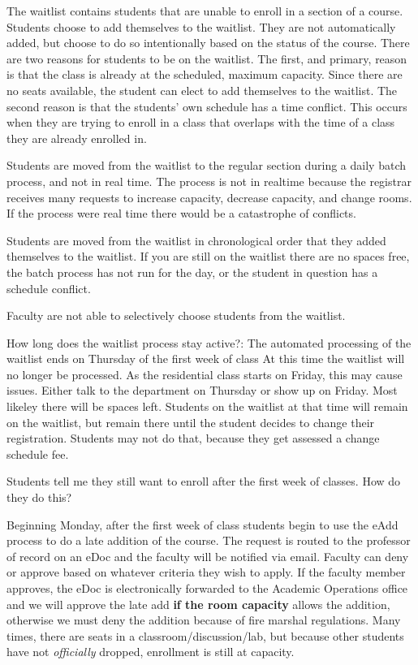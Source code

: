 The waitlist contains students that are unable to enroll in a section of
a course. Students choose to add themselves to the waitlist. They are
not automatically added, but choose to do so intentionally based on the
status of the course. There are two reasons for students to be on the
waitlist. The first, and primary, reason is that the class is already at
the scheduled, maximum capacity. Since there are no seats available, the
student can elect to add themselves to the waitlist. The second reason
is that the students' own schedule has a time conflict. This occurs when
they are trying to enroll in a class that overlaps with the time of a
class they are already enrolled in.

Students are moved from the waitlist to the regular section during a
daily batch process, and not in real time. The process is not in
realtime because the registrar receives many requests to increase
capacity, decrease capacity, and change rooms. If the process were real
time there would be a catastrophe of conflicts.

Students are moved from the waitlist in chronological order that they
added themselves to the waitlist. If you are still on the waitlist there
are no spaces free, the batch process has not run for the day, or the
student in question has a schedule conflict.

Faculty are not able to selectively choose students from the waitlist.

How long does the waitlist process stay active?: The automated
processing of the waitlist ends on Thursday of the first week of class
At this time the waitlist will no longer be processed. 
As the residential class starts on Friday, this may cause
issues. Either talk to the department on Thursday or show up on
Friday. Most likeley there will be spaces left. 
Students on the waitlist at that time will remain on the waitlist, but remain there
until the student decides to change their registration. Students may not
do that, because they get assessed a change schedule fee.

Students tell me they still want to enroll after the first week of
classes. How do they do this?

Beginning Monday, after the first week of class students begin to use
the eAdd process to do a late addition of the course. The request is
routed to the professor of record on an eDoc and the faculty will be
notified via email. Faculty can deny or approve based on whatever
criteria they wish to apply. If the faculty member approves, the eDoc
is electronically forwarded to the Academic Operations office and we
will approve the late add \textbf{if the room capacity} allows the
addition, otherwise we must deny the addition because of fire marshal
regulations. Many times, there are seats in a
classroom/discussion/lab, but because other students have not
\emph{officially} dropped, enrollment is still at capacity.

